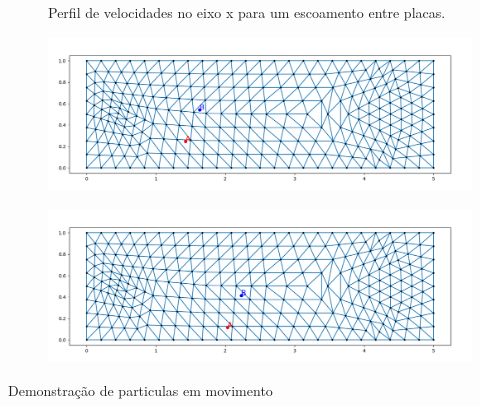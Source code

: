 \documentclass{beamer}
\begin{document}
\begin{frame}
  \begin{figure}
     {\raggedleft \tiny Perfil de velocidades no eixo x para um escoamento entre placas.}
  \end{figure}
  
  \begin{minipage}{.49\textwidth}
    \begin{figure}
      \includegraphics[width=\linewidth]{figure/particles_results_2.png}
    \end{figure}
  \end{minipage}
  \begin{minipage}{.49\textwidth}
    \begin{figure}
      \includegraphics[width=\linewidth]{figure/particles_results_3.png}
    \end{figure}
  \end{minipage}
  
  \tiny{Demonstração de particulas em movimento}
\end{frame}

\end{document}
